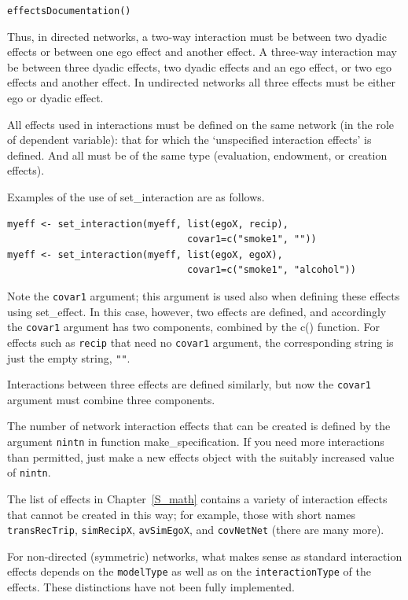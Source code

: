 \documentclass[a4paper,fleqn,11pt]{article}
\newcommand{\+}{\, + \,}
\newcommand{\sfn}[1]{\textsf{#1}}
\begin{document}
\verb|effectsDocumentation()|
\bigskip

Thus, in directed networks, a two-way interaction must be between two dyadic
effects or between one ego effect and another effect. A three-way interaction
may be between three dyadic effects, two dyadic effects and an ego effect, or
two ego effects and another effect. In undirected networks all three effects
must be either ego or dyadic effect.

All effects used in interactions must be defined on the same network
(in the role of dependent variable): that for
which the `unspecified
interaction effects' is defined.  And all must be
of the same type (evaluation, endowment, or creation effects).

Examples of the use of \sfn{set\_interaction} are as follows.
\begin{verbatim}
myeff <- set_interaction(myeff, list(egoX, recip),
                                covar1=c("smoke1", ""))
myeff <- set_interaction(myeff, list(egoX, egoX),
                                covar1=c("smoke1", "alcohol"))
\end{verbatim}
Note the \texttt{covar1} argument; this argument is used also
when defining these effects using \sfn{set\_effect}.
In this case, however, two effects are defined,
and accordingly the \texttt{covar1} argument has two components,
combined by the \sfn{c()} function.
For effects such as \texttt{recip} that need no \texttt{covar1}
argument, the corresponding string is just the empty string, \texttt{""}.

Interactions between three effects are defined similarly,
but now the \texttt{covar1} argument must combine three components.

The number of network interaction effects that can be created is defined by the
argument \texttt{nintn} in function \sfn{make\_specification}. If you need more
interactions than permitted, just make a new effects object with the
suitably increased value of \texttt{nintn}.

The list of effects in Chapter~\ref{S_math} contains a variety of
interaction effects that cannot be created in this way;
for example, those with short names
\texttt{transRecTrip}, \texttt{simRecipX},  \texttt{avSimEgoX},
and \texttt{covNetNet} (there are many more).
\medskip

For non-directed (symmetric) networks, what makes sense as standard interaction
effects depends on the \texttt{modelType} as well as on the
 \texttt{interactionType} of the effects. These distinctions have not been fully
implemented.
\end{document}
